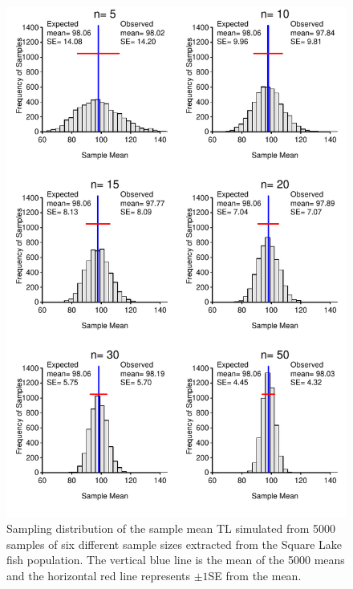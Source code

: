 \documentclass[10pt,openany]{book}\usepackage[]{graphicx}\usepackage[]{color}
\newenvironment{knitrout}{}{} %
\begin{document}
\begin{knitrout}
\color{fgcolor}\begin{figure}[hbtp]

{\centering \includegraphics[width=.8\linewidth]{Figs/SampDistSLMeann-1} 

}

\caption[Sampling distribution of sample means from Square Lake]{Sampling distribution of the sample mean TL simulated from 5000 samples of six different sample sizes extracted from the Square Lake fish population.  The vertical blue line is the mean of the 5000 means and the horizontal red line represents $\pm1$SE from the mean.}\label{fig:SampDistSLMeann}
\end{figure}


\end{knitrout}
\end{document}
